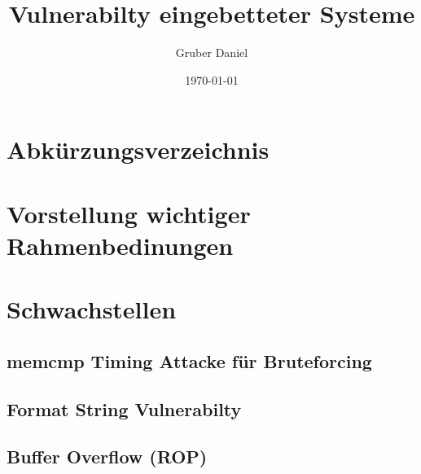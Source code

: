 \documentclass[a4paper,
DIV=13,
12pt,
BCOR=10mm,
department=FakIM,
oneside,
parskip=half,
automark,
listof=totocnumbered,
bibliography=totocnumbered,
acronym=totocnumbered
] {OTHRartcl}
\date{\today}
\title{Vulnerabilty eingebetteter Systeme}
\author{Gruber Daniel}
\begin{document}
\maketitle

\tableofcontents
\newpage

\section*{Abkürzungsverzeichnis}
\label{abkuerzungsverzeichnis}
\begin{acronym}[AUTOSAR]

\end{acronym}


\section{Vorstellung wichtiger Rahmenbedinungen}





\section{Schwachstellen}
\subsection{memcmp Timing Attacke für Bruteforcing}
\subsection{Format String Vulnerabilty}
\subsection{Buffer Overflow (ROP)}

\end{document}
